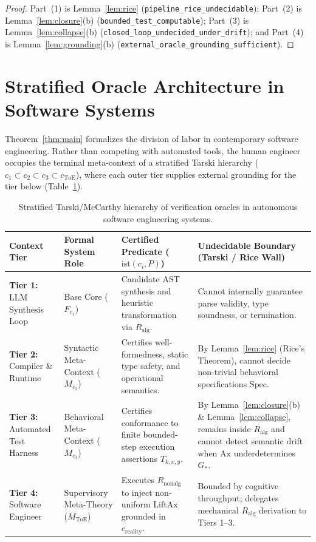 \documentclass[11pt]{article}
\theoremstyle{plain}
\theoremstyle{definition}
\theoremstyle{remark}
\newcommand{\ist}{\mathrm{ist}}
\newcommand{\Spec}{\mathrm{Spec}}
\newcommand{\Ax}{\mathrm{Ax}}
\newcommand{\LiftAx}{\mathrm{LiftAx}}
\newcommand{\Rnonalg}{R_{\mathrm{nonalg}}}
\newcommand{\Ralg}{R_{\mathrm{alg}}}
\newcommand{\MToE}{M_{\mathrm{ToE}}}
\newcommand{\creal}{c_{\mathrm{reality}}}
\begin{document}
\begin{proof}
Part~(1) is Lemma~\ref{lem:rice} (\texttt{pipeline\_rice\_undecidable});
Part~(2) is Lemma~\ref{lem:closure}(b) (\texttt{bounded\_test\_computable});
Part~(3) is Lemma~\ref{lem:collapse}(b)
(\texttt{closed\_loop\_undecided\_under\_drift}); and Part~(4) is
Lemma~\ref{lem:grounding}(b) (\texttt{external\_oracle\_grounding\_sufficient}).
\end{proof}

\section{Stratified Oracle Architecture in Software Systems}\label{sec:arch}

Theorem~\ref{thm:main} formalizes the division of labor in contemporary software
engineering. Rather than competing with automated tools, the human engineer
occupies the terminal meta-context of a stratified Tarski hierarchy
($c_1 \subset c_2 \subset c_3 \subset c_{\mathrm{ToE}}$), where each outer tier
supplies external grounding for the tier below (Table~\ref{tab:tiers}).

\begin{table}[htbp]
\centering
\small
\renewcommand{\arraystretch}{1.35}
\begin{tabular}{@{}p{}p{}p{}p{}@{}}
\toprule
\textbf{Context Tier} & \textbf{Formal System Role} & \textbf{Certified Predicate ($\ist(c_i, P)$)} & \textbf{Undecidable Boundary (Tarski / Rice Wall)} \\
\midrule
\textbf{Tier 1:} LLM Synthesis Loop &
  Base Core ($F_{c_1}$) &
  Candidate AST synthesis and heuristic transformation via $\Ralg$. &
  Cannot internally guarantee parse validity, type soundness, or termination. \\
\textbf{Tier 2:} Compiler \& Runtime &
  Syntactic Meta-Context ($M_{c_2}$) &
  Certifies well-formedness, static type safety, and operational semantics. &
  By Lemma~\ref{lem:rice} (Rice's Theorem), cannot decide non-trivial behavioral specifications $\Spec$. \\
\textbf{Tier 3:} Automated Test Harness &
  Behavioral Meta-Context ($M_{c_3}$) &
  Certifies conformance to finite bounded-step execution assertions $T_{k,x,y}$. &
  By Lemma~\ref{lem:closure}(b) \& Lemma~\ref{lem:collapse}, remains inside $\Ralg$ and cannot detect semantic drift when $\Ax$ underdetermines $G_*$. \\
\textbf{Tier 4:} Software Engineer &
  Supervisory Meta-Theory ($\MToE$) &
  Executes $\Rnonalg$ to inject non-uniform $\LiftAx$ grounded in $\creal$. &
  Bounded by cognitive throughput; delegates mechanical $\Ralg$ derivation to Tiers 1--3. \\
\bottomrule
\end{tabular}
\caption{Stratified Tarski/McCarthy hierarchy of verification oracles in autonomous software engineering systems.}
\label{tab:tiers}
\end{table}
\end{document}
